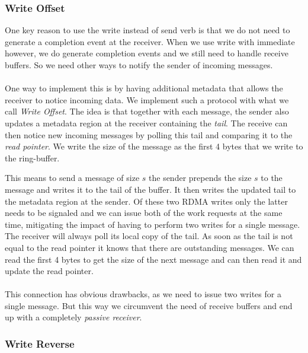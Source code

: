\pagebreak
\subsubsection{Write Offset}

One key reason to use the write instead of send verb is that we do not need to generate a completion event at the receiver.
 When we use  write with immediate however, we do generate completion events and we still need to handle receive
buffers. So we need other ways to notify the sender of incoming messages.

\paragraph{} One way to implement this is by having additional metadata that allows the receiver to notice incoming data.
We implement such a protocol with what we call \emph{Write Offset}. The idea is that together with each message, the sender
also updates a metadata region at the receiver containing the \emph{tail}. The receive can then notice new incoming messages
by polling this tail and comparing it to the \emph{read pointer}. We write the size of the message as the first 4 bytes 
that we write to the ring-buffer.

This means to send a message of size $s$ the sender prepends the size $s$ to the message and writes it to the
tail of the buffer. It then writes the updated tail to the metadata region at the sender. Of these two RDMA writes only the 
latter needs to be signaled and we can issue both of the work requests at the same time, mitigating the impact of having to 
perform two writes for a single message. The receiver will always poll its local copy of the tail. As soon as the tail is 
not equal to the read pointer it knows that there are outstanding messages. We can read the first 4 bytes to get the size
of the next message and can then read it and update the read pointer.

\paragraph{} This connection has obvious drawbacks, as we need to issue two writes for a single message. But this way we 
circumvent the need of receive buffers and end up with a completely \emph{passive receiver}.

\subsubsection{Write Reverse}

